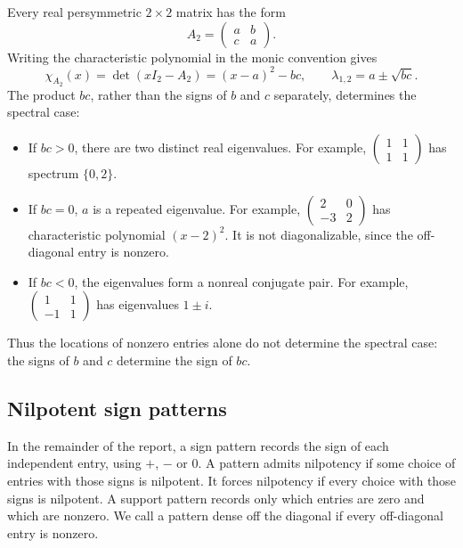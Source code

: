 \documentclass[11pt,a4paper]{article}
\begin{document}
Every real persymmetric $2\times2$ matrix has the form
\[
 A_2=\begin{pmatrix}a&b\\c&a\end{pmatrix}.
\]
Writing the characteristic polynomial in the monic convention gives
\begin{equation}\label{eq:two-by-two}
 \chi_{A_2}(x)=\det(xI_2-A_2)=(x-a)^2-bc,
 \qquad \lambda_{1,2}=a\pm\sqrt{bc}.
\end{equation}
The product $bc$, rather than the signs of $b$ and $c$ separately, determines
the spectral case:
\begin{itemize}
 \item If $bc>0$, there are two distinct real eigenvalues. For example,
 $\left(\begin{smallmatrix}1&1\\1&1\end{smallmatrix}\right)$ has spectrum
 $\{0,2\}$.
 \item If $bc=0$, $a$ is a repeated eigenvalue. For example,
 $\left(\begin{smallmatrix}2&0\\-3&2\end{smallmatrix}\right)$ has
 characteristic polynomial $(x-2)^2$. It is not diagonalizable, since the
 off-diagonal entry is nonzero.
 \item If $bc<0$, the eigenvalues form a nonreal conjugate pair. For example,
 $\left(\begin{smallmatrix}1&1\\-1&1\end{smallmatrix}\right)$ has
 eigenvalues $1\pm i$.
\end{itemize}
Thus the locations of nonzero entries alone do not determine the spectral
case: the signs of $b$ and $c$ determine the sign of $bc$.


\subsection{Nilpotent sign patterns}
\label{sec:two-nilpotent}

In the remainder of the report, a sign pattern records the sign of each
independent entry, using $+$, $-$ or $0$. A pattern admits nilpotency
if some choice of entries with those signs is nilpotent. It forces
nilpotency if every choice with those signs is nilpotent. A support pattern
records only which entries are zero and which are nonzero. We call a
pattern dense off the diagonal if every off-diagonal entry is nonzero.
\end{document}
